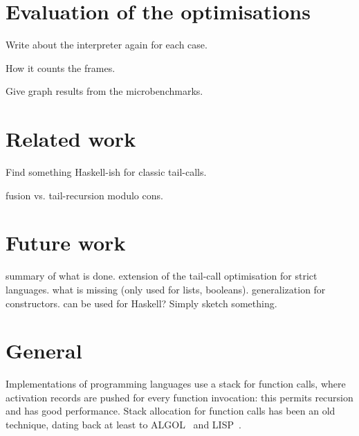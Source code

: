 \documentclass[diploma]{softlab-thesis}
\begin{document}

\chapter {Evaluation of the optimisations }

Write about the interpreter again for each case.

How it counts the frames. 

Give graph results from the microbenchmarks.

\chapter{Related work}

Find something Haskell-ish for classic tail-calls.

fusion vs. tail-recursion modulo cons.


\chapter{Future work}
summary of what is done.
extension of the tail-call optimisation for strict
languages.
what is missing (only used for lists, booleans).
generalization for constructors.
can be used for Haskell? Simply sketch something.










\backmatter

\appendix

\chapter{General}

Implementations of programming languages use a stack for function calls, where activation records are pushed for every function invocation: this permits recursion and has good performance. Stack allocation for function calls has been an old technique, dating back at least to ALGOL~\cite{Dijkstra60,Naur78} and LISP~\cite{McCarthy60,Stoyan79}.
\end{document}
